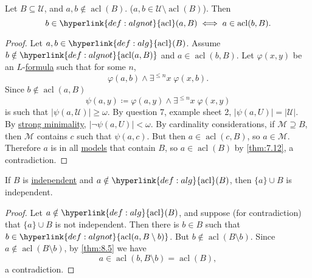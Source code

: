 \documentclass{article}
\DeclareMathOperator{\acl}{acl}
\newcommand{\named}[1]{\textbf{#1}\index{#1}}
\begin{document}
\begin{nthm}\label{thm:8.5}
  Let $B \subseteq \mathcal{U}$, and $a,b \notin \acl(B)$. ($a,b \in \mathcal{U} \setminus \acl(B)$).
  Then
  \begin{equation*}
    b \in \hyperlink{def:algnot}{\acl}(a,B) \iff a \in \acl(b,B).
  \end{equation*}
\end{nthm}
\begin{proof}
  Let $a,b \in \hyperlink{def:alg}{\acl}(B)$. Assume $b \notin \hyperlink{def:algnot}{\acl(a,B)}$ and $a \in \acl(b,B)$.
  Let $\varphi(x,y)$ be an $L$-\hyperlink{def:form}{formula} such that for some $n$,
  \begin{equation*}
    \varphi(a,b) \land \exists^{\leq n} x \; \varphi(x,b).
  \end{equation*}
  Since $b \notin \acl(a,B)$
  \begin{equation*}
    \psi(a,y) \coloneqq \varphi(a,y) \land \exists^{\leq n} x \; \varphi(x,y)
  \end{equation*}
  is such that $|\psi(a,\mathcal{U})| \geq \omega$.
  By question 7, example sheet 2, $|\psi(a,U)| = |\mathcal{U}|$.
  By \hyperlink{def:minimal}{strong minimality}, $|\neg \psi(a,U)| < \omega$.
  By cardinality considerations, if $\mathcal{M} \supseteq B$, then $\mathcal{M}$ contains $c$ such that $\psi(a,c)$.
  But then $a \in \acl(c,B)$, so $a \in \mathcal{M}$.
  Therefore $a$ is in all \hyperlink{def:model}{models} that contain $B$, so $a \in \acl(B)$ by \cref{thm:7.12}, a contradiction.
\end{proof}
\begin{nlemma}\label{lem:8.7}
  If $B$ is \hyperlink{def:indep}{independent} and $a \notin \hyperlink{def:alg}{\acl}(B)$, then $\{a\} \cup B$ is independent.
\end{nlemma}
\begin{proof}
  Let $a \notin \hyperlink{def:alg}{\acl}(B)$, and suppose (for contradiction) that $\{a\} \cup B$ is not independent.
  Then there is $b \in B$ such that $b \in \hyperlink{def:algnot}{\acl(a, B\setminus b)}$.
  But $b \notin \acl(B \setminus b)$. Since $a \notin \acl(B \setminus b)$, by \cref{thm:8.5} we have
  \begin{equation*}
    a \in \acl(b, B \setminus b) = \acl(B),
  \end{equation*}
  a contradiction.
\end{proof}
\end{document}
